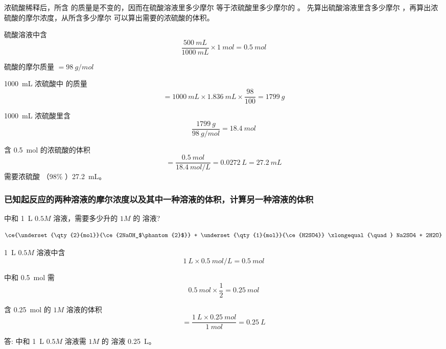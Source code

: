 浓硫酸稀释后，所含  的质量是不变的，因而在硫酸溶液里多少摩尔   等于浓硫酸里多少摩尔的 。 
先算出硫酸溶液里含多少摩尔 ，再算出浓硫酸的摩尔浓度，从所含多少摩尔  可以算出需要的浓硫酸的体积。
\begin{solution}
硫酸溶液中含 
\[ \frac{\qty{500}{mL}}{\qty{1000}{mL}}\times \qty{1}{mol} =\qty{0.5}{mol} \]

硫酸的摩尔质量 $=\qty{98}{g/mol}$

\qty{1000}{mL} 浓硫酸中  的质量
\[ = \qty{1000}{mL} \times \qty{1.836}{mL} \times \frac{98}{100} = \qty{1799}{g}\]

\qty{1000}{mL} 浓硫酸里含 
\[ \frac{\qty{1799}{g}}{\qty{98}{g/mol}}=\qty{18.4}{mol} \]

含 \qty{0.5}{mol}  的浓硫酸的体积
\[ = \frac{\qty{0.5}{mol}}{\qty{18.4}{mol/L}}=\qty{0.0272}{L}=\qty{27.2}{mL} \]
需要浓硫酸 （98\% ）\qty{27.2}{mL}。
\end{solution}

\subsubsection{已知起反应的两种溶液的摩尔浓度以及其中一种溶液的体积，计算另一种溶液的体积}
\begin{example}
  中和 \qty{1}{L} $0.5M$  溶液，需要多少升的 $1M$ 的  溶液?
\end{example}
\begin{solution}
  \[ \ce{\underset{\qty{2}{mol}}{\ce{2NaOH_$\phantom{2}$}} + \underset{\qty{1}{mol}}{\ce{H2SO4}} \xlongequal{\quad} Na2SO4 + 2H2O} \]

  \qty{1}{L} $0.5M$ 溶液中含 
  \[ \qty{1}{L} \times \qty{0.5}{mol/L} = \qty{0.5}{mol}\]

中和 \qty{0.5}{mol}  需 
\[ \qty{0.5}{mol}\times\frac{1}{2}=\qty{0.25}{mol} \]

含 \qty{0.25}{mol} 的 $1M$  溶液的体积
\[= \frac{\qty{1}{L} \times \qty{0.25}{mol}}{\qty{1}{mol}} = \qty{0.25}{L}\]

答: 中和 \qty{1}{L} $0.5M$  溶液需 $1M$ 的  溶液 \qty{0.25}{L}。
\end{solution}

